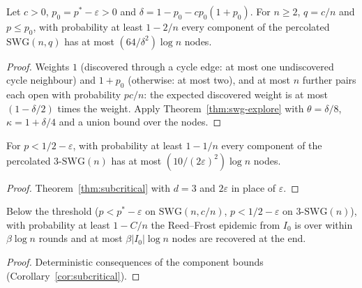 \begin{theorem}\label{thm:swg-sub}
\leanok{}
Let $c > 0$, $p_0 = p^* - \varepsilon > 0$ and $\delta = 1 - p_0 - c p_0 (1 + p_0)$. For $n \ge 2$, $q =
c/n$ and $p \le p_0$, with probability at least $1 - 2/n$ every component of the percolated
$\mathrm{SWG}(n, q)$ has at most $(64/\delta^2) \log n$ nodes.
\end{theorem}
\begin{proof}\leanok
Weights $1$ (discovered through a cycle edge: at most one undiscovered cycle neighbour) and $1 +
p_0$ (otherwise: at most two), and at most $n$ further pairs each open with probability $pc/n$:
the expected discovered weight is at most $(1 - \delta/2)$ times the weight. Apply
Theorem~\ref{thm:swg-explore} with $\theta = \delta/8$, $\kappa = 1 + \delta/4$ and a union bound
over the nodes.
\end{proof}

\begin{corollary}\label{cor:swg3-sub}
\leanok{}
For $p < 1/2 - \varepsilon$, with probability at least $1 - 1/n$ every component of the percolated
$3\text{-}\mathrm{SWG}(n)$ has at most $(10/(2\varepsilon)^2) \log n$ nodes.
\end{corollary}
\begin{proof}\leanok
Theorem~\ref{thm:subcritical} with $d = 3$ and $2\varepsilon$ in place of $\varepsilon$.
\end{proof}

\begin{corollary}\label{cor:swg-rf}
\leanok{}
Below the threshold ($p < p^* - \varepsilon$ on $\mathrm{SWG}(n, c/n)$, $p < 1/2 - \varepsilon$ on
$3\text{-}\mathrm{SWG}(n)$), with probability at least $1 - C/n$ the Reed--Frost epidemic from $I_0$
is over within $\beta \log n$ rounds and at most $\beta |I_0| \log n$ nodes are recovered at the end.
\end{corollary}
\begin{proof}\leanok
Deterministic consequences of the component bounds (Corollary~\ref{cor:subcritical}).
\end{proof}

